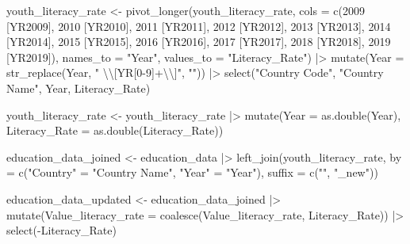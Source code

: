 \documentclass[
  letterpaper,
  DIV=11,
  numbers=noendperiod]{scrartcl}
\newenvironment{Shaded}{\begin{snugshade}}{\end{snugshade}}
\newcommand{\AttributeTok}[1]{\textcolor[rgb]{0.40,0.45,0.13}{#1}}
\newcommand{\FunctionTok}[1]{\textcolor[rgb]{0.28,0.35,0.67}{#1}}
\newcommand{\NormalTok}[1]{\textcolor[rgb]{0.00,0.23,0.31}{#1}}
\newcommand{\OtherTok}[1]{\textcolor[rgb]{0.00,0.23,0.31}{#1}}
\newcommand{\SpecialCharTok}[1]{\textcolor[rgb]{0.37,0.37,0.37}{#1}}
\newcommand{\StringTok}[1]{\textcolor[rgb]{0.13,0.47,0.30}{#1}}
\begin{document}
\begin{Shaded}
\begin{Highlighting}[]
\NormalTok{youth\_literacy\_rate }\OtherTok{\textless{}{-}} \FunctionTok{pivot\_longer}\NormalTok{(youth\_literacy\_rate, }
                                   \AttributeTok{cols =} \FunctionTok{c}\NormalTok{(}\StringTok{\textquotesingle{}2009 [YR2009]\textquotesingle{}}\NormalTok{, }\StringTok{\textquotesingle{}2010 [YR2010]\textquotesingle{}}\NormalTok{, }\StringTok{\textquotesingle{}2011 [YR2011]\textquotesingle{}}\NormalTok{, }\StringTok{\textquotesingle{}2012 [YR2012]\textquotesingle{}}\NormalTok{, }\StringTok{\textquotesingle{}2013 [YR2013]\textquotesingle{}}\NormalTok{, }\StringTok{\textquotesingle{}2014 [YR2014]\textquotesingle{}}\NormalTok{, }\StringTok{\textquotesingle{}2015 [YR2015]\textquotesingle{}}\NormalTok{, }\StringTok{\textquotesingle{}2016 [YR2016]\textquotesingle{}}\NormalTok{, }\StringTok{\textquotesingle{}2017 [YR2017]\textquotesingle{}}\NormalTok{, }\StringTok{\textquotesingle{}2018 [YR2018]\textquotesingle{}}\NormalTok{, }\StringTok{\textquotesingle{}2019 [YR2019]\textquotesingle{}}\NormalTok{), }
                                   \AttributeTok{names\_to =} \StringTok{"Year"}\NormalTok{,                  }
                                   \AttributeTok{values\_to =} \StringTok{"Literacy\_Rate"}\NormalTok{) }\SpecialCharTok{|\textgreater{}}
  \FunctionTok{mutate}\NormalTok{(}\AttributeTok{Year =} \FunctionTok{str\_replace}\NormalTok{(Year, }\StringTok{" }\SpecialCharTok{\textbackslash{}\textbackslash{}}\StringTok{[YR[0{-}9]+}\SpecialCharTok{\textbackslash{}\textbackslash{}}\StringTok{]"}\NormalTok{, }\StringTok{""}\NormalTok{)) }\SpecialCharTok{|\textgreater{}}
  \FunctionTok{select}\NormalTok{(}\StringTok{"Country Code"}\NormalTok{, }\StringTok{"Country Name"}\NormalTok{, Year, Literacy\_Rate)}

\NormalTok{youth\_literacy\_rate }\OtherTok{\textless{}{-}}\NormalTok{ youth\_literacy\_rate }\SpecialCharTok{|\textgreater{}}
  \FunctionTok{mutate}\NormalTok{(}\AttributeTok{Year =} \FunctionTok{as.double}\NormalTok{(Year),}
         \AttributeTok{Literacy\_Rate =} \FunctionTok{as.double}\NormalTok{(Literacy\_Rate))}


\NormalTok{education\_data\_joined }\OtherTok{\textless{}{-}}\NormalTok{ education\_data }\SpecialCharTok{|\textgreater{}}
  \FunctionTok{left\_join}\NormalTok{(youth\_literacy\_rate, }
            \AttributeTok{by =} \FunctionTok{c}\NormalTok{(}\StringTok{"Country"} \OtherTok{=} \StringTok{"Country Name"}\NormalTok{, }\StringTok{"Year"} \OtherTok{=} \StringTok{"Year"}\NormalTok{), }
            \AttributeTok{suffix =} \FunctionTok{c}\NormalTok{(}\StringTok{""}\NormalTok{, }\StringTok{"\_new"}\NormalTok{))}

\NormalTok{education\_data\_updated }\OtherTok{\textless{}{-}}\NormalTok{ education\_data\_joined }\SpecialCharTok{|\textgreater{}}
  \FunctionTok{mutate}\NormalTok{(}\AttributeTok{Value\_literacy\_rate =} \FunctionTok{coalesce}\NormalTok{(Value\_literacy\_rate, }
\NormalTok{                                        Literacy\_Rate)) }\SpecialCharTok{|\textgreater{}}
  \FunctionTok{select}\NormalTok{(}\SpecialCharTok{{-}}\NormalTok{Literacy\_Rate)}
\end{Highlighting}
\end{Shaded}
\end{document}
